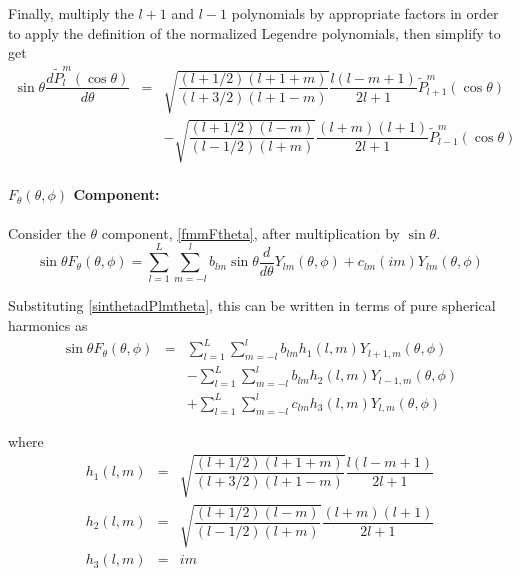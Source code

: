 Finally, multiply the $l+1$ and $l-1$ polynomials by appropriate factors in order to apply the definition of the normalized Legendre polynomials, then simplify to get
\begin{eqnarray}
\sin\theta \dfrac{d \widetilde P_l^m(\cos\theta)}{d\theta} & =& \sqrt{\dfrac{(l + 1/2)(l+1+m)}{(l+3/2)(l+1-m)}}\dfrac{l(l-m+1)}{2l+1}\widetilde P_{l+1}^m(\cos\theta) \nonumber \\ 
\ & \  & - \sqrt{\dfrac{(l + 1/2)(l-m)}{(l-1/2)(l+m)}}\dfrac{(l+m)(l+1)}{2l+1}\widetilde P_{l-1}^m(\cos\theta) \label{sinthetadPlmtheta}
\end{eqnarray}

\paragraph{$F_{\theta}(\theta,\phi)$ Component:}

Consider the $\theta$ component, \eqref{fmmFtheta}, after multiplication by $\sin\theta$.  
\begin{equation}
\sin\theta F_{\theta}(\theta,\phi) =  \sum_{l=1}^{L} \sum_{m = -l}^{l} b_{lm}  \sin\theta\dfrac{d}{d\theta} Y_{lm}(\theta,\phi)   + c_{lm} (im)  Y_{lm}(\theta,\phi)  
\end{equation}

Substituting \eqref{sinthetadPlmtheta}, this can be written in terms of pure spherical harmonics as
\begin{eqnarray}
\sin\theta F_{\theta}(\theta,\phi) &=& \sum_{l=1}^{L} \sum_{m = -l}^{l} b_{lm} h_1(l,m) Y_{l+1,m}(\theta,\phi) \nonumber \\
\ & \ & - \sum_{l=1}^{L} \sum_{m = -l}^{l} b_{lm} h_2(l,m) Y_{l-1,m} (\theta,\phi) \nonumber \\
\ & \  & + \sum_{l=1}^{L} \sum_{m = -l}^{l} c_{lm}  h_3(l,m)Y_{l,m}(\theta,\phi)
\end{eqnarray}

\noindent where
\begin{eqnarray}
h_1(l,m) &=&  \sqrt{\dfrac{(l + 1/2)(l+1+m)}{(l+3/2)(l+1-m)}}\dfrac{l(l-m+1)}{2l+1} \\
h_2(l,m) &=& \sqrt{\dfrac{(l + 1/2)(l-m)}{(l-1/2)(l+m)}}\dfrac{(l+m)(l+1)}{2l+1} \\ 
h_3(l,m) &=& im
\end{eqnarray}

